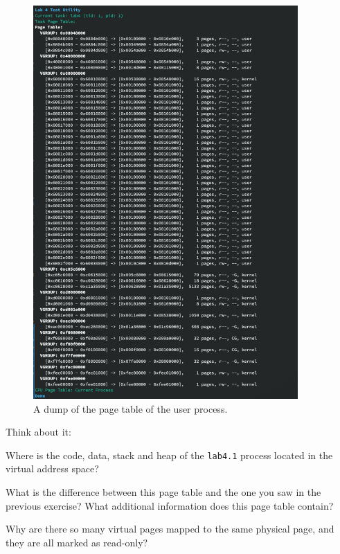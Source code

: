 \begin{figure}[htbp]
    \centering
    \includegraphics[width=0.9\textwidth]{assets/c4.user-page-table-dump.png}
    \caption{A dump of the page table of the user process.}
    \label{fig:user_mm_dump_pagetable}
\end{figure}

\begin{exercise*}{Think about it:}
    \item Where is the code, data, stack and heap of the \texttt{lab4.1} process
    located in the virtual address space?
    \item What is the difference between this page table and the one you saw
    in the previous exercise? What additional information does this page table
    contain?
    \item Why are there so many virtual pages mapped to the same physical page, and
    they are all marked as read-only?
\end{exercise*}

